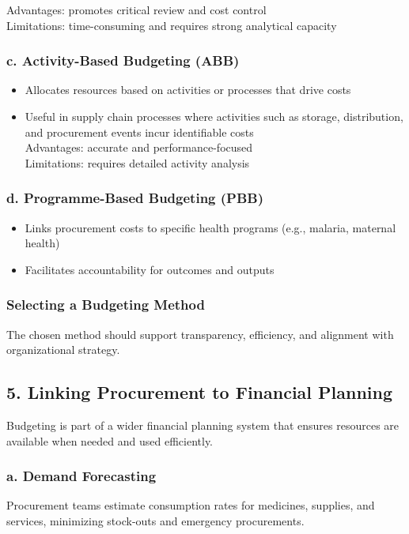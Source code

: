 \documentclass[10pt]{article}
\begin{document}
Advantages: promotes critical review and cost control\\
Limitations: time-consuming and requires strong analytical capacity

\subsubsection*{c. Activity-Based Budgeting (ABB)}
\begin{itemize}
  \item Allocates resources based on activities or processes that drive costs
  \item Useful in supply chain processes where activities such as storage, distribution, and procurement events incur identifiable costs\\
Advantages: accurate and performance-focused\\
Limitations: requires detailed activity analysis
\end{itemize}

\subsubsection*{d. Programme-Based Budgeting (PBB)}
\begin{itemize}
  \item Links procurement costs to specific health programs (e.g., malaria, maternal health)
  \item Facilitates accountability for outcomes and outputs
\end{itemize}

\subsubsection*{Selecting a Budgeting Method}
The chosen method should support transparency, efficiency, and alignment with organizational strategy.

\subsection*{5. Linking Procurement to Financial Planning}
Budgeting is part of a wider financial planning system that ensures resources are available when needed and used efficiently.

\subsubsection*{a. Demand Forecasting}
Procurement teams estimate consumption rates for medicines, supplies, and services, minimizing stock-outs and emergency procurements.
\end{document}
